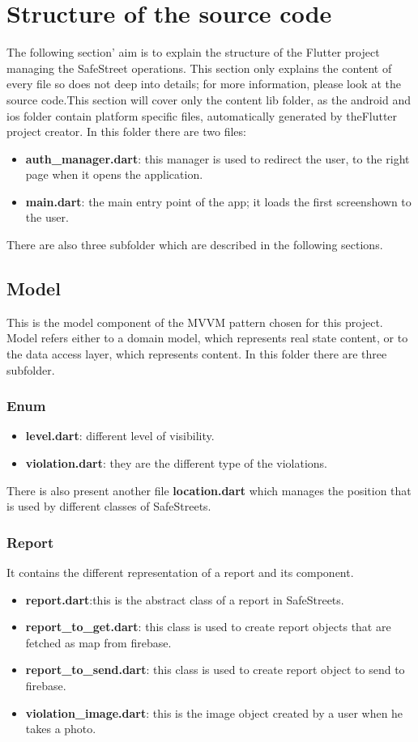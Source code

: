 \documentclass[../ITD.tex]{subfiles}
\begin{document}
    \chapter{Structure of the source code}\label{ch:structure-of-the-source-code}
    The following section' aim is to explain the structure of the Flutter project managing the SafeStreet operations. This section only explains the content of every file so does not deep into details; for more information, please look at the source code.This section will cover only the content lib folder, as the android and ios folder contain platform specific files, automatically generated by theFlutter project creator.
    In this folder there are two files:
    \begin{itemize}
        \item \textbf{auth\_manager.dart}: this manager is used to redirect the user, to the right page when it opens the application.
        \item \textbf{main.dart}: the main entry point of the app; it loads the first screenshown to the user.
    \end{itemize}
    There are also three subfolder which are described in the following sections.
    \section{Model}\label{sec:model}
    This is the model component of the MVVM pattern chosen for this project.
    Model refers either to a domain model, which represents real state content, or to the data access layer, which represents content.
    In this folder there are three subfolder.
    \subsection{Enum}\label{subsec:enum}
    \begin{itemize}
        \item \textbf{level.dart}: different level of visibility.
        \item \textbf{violation.dart}: they are the different type of the violations.
    \end{itemize}
    There is also present another file \textbf{location.dart} which manages the position that is used by different classes of SafeStreets.
    \subsection{Report}\label{subsec:report}
    It contains the different representation of a report and its component.
    \begin{itemize}
        \item \textbf{report.dart}:this is the abstract class of a report in SafeStreets.
        \item \textbf{report\_to\_get.dart}: this class is used to create report objects that are fetched as map from firebase.
        \item \textbf{report\_to\_send.dart}: this class is used to create report object to send to firebase.
        \item \textbf{violation\_image.dart}: this is the image object created by a user when he takes a photo.
    \end{itemize}
\end{document}
